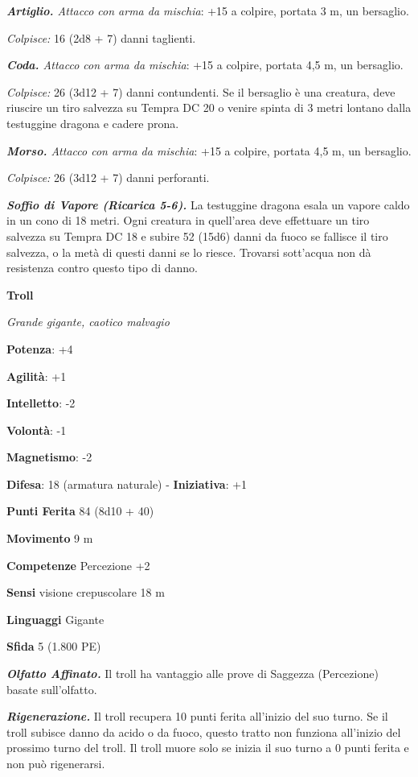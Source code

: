 \begin{multicols}{2}
\emph{\textbf{Artiglio.} Attacco con arma da mischia}: +15 a colpire,
portata 3 m, un bersaglio.

\emph{Colpisce:} 16 (2d8 + 7) danni taglienti.

\emph{\textbf{Coda.} Attacco con arma da mischia}: +15 a colpire,
portata 4,5 m, un bersaglio.

\emph{Colpisce:} 26 (3d12 + 7) danni contundenti. Se il bersaglio è una
creatura, deve riuscire un tiro salvezza su Tempra DC 20 o venire spinta
di 3 metri lontano dalla testuggine dragona e cadere prona.

\emph{\textbf{Morso.} Attacco con arma da mischia}: +15 a colpire,
portata 4,5 m, un bersaglio.

\emph{Colpisce:} 26 (3d12 + 7) danni perforanti.

\emph{\textbf{Soffio di Vapore (Ricarica 5-6).}} La testuggine dragona
esala un vapore caldo in un cono di 18 metri. Ogni creatura in
quell'area deve effettuare un tiro salvezza su Tempra DC 18 e
subire 52 (15d6) danni da fuoco se fallisce il tiro salvezza, o la metà
di questi danni se lo riesce. Trovarsi sott'acqua non dà resistenza
contro questo tipo di danno.

\textbf{Troll}

\emph{Grande gigante, caotico malvagio}

\textbf{Potenza}: +4

\textbf{Agilità}: +1

\textbf{Intelletto}: -2

\textbf{Volontà}: -1

\textbf{Magnetismo}: -2

\textbf{Difesa}: 18 (armatura naturale) - \textbf{Iniziativa}: +1

\textbf{Punti Ferita} 84 (8d10 + 40)

\textbf{Movimento} 9 m

\textbf{Competenze} Percezione +2

\textbf{Sensi} visione crepuscolare 18 m

\textbf{Linguaggi} Gigante

\textbf{Sfida} 5 (1.800 PE)

\emph{\textbf{Olfatto Affinato.}} Il troll ha vantaggio alle prove di
Saggezza (Percezione) basate sull'olfatto.

\emph{\textbf{Rigenerazione.}} Il troll recupera 10 punti ferita
all'inizio del suo turno. Se il troll subisce danno da acido o da fuoco,
questo tratto non funziona all'inizio del prossimo turno del troll. Il
troll muore solo se inizia il suo turno a 0 punti ferita e non può
rigenerarsi.


\end{multicols}
